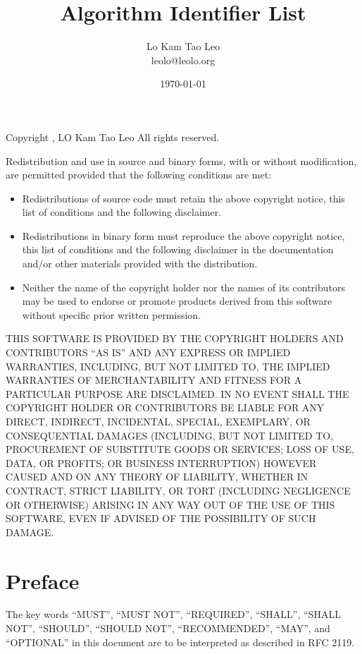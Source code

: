 \documentclass[a4paper,12pt]{article}
\title{Algorithm Identifier List}
\author{Lo Kam Tao Leo\\leolo@leolo.org}
\date{\today}
\begin{document}
	\tableofcontents
	\vspace{25.4mm}
	\noindent
	Copyright , LO Kam Tao Leo
	All rights reserved.
	
	Redistribution and use in source and binary forms, with or without
	modification, are permitted provided that the following conditions are met:
	\begin{itemize}
		\item Redistributions of source code must retain the above copyright notice, this
		list of conditions and the following disclaimer.
		
		\item Redistributions in binary form must reproduce the above copyright notice,
		this list of conditions and the following disclaimer in the documentation
		and/or other materials provided with the distribution.
		
		\item Neither the name of the copyright holder nor the names of its
		contributors may be used to endorse or promote products derived from
		this software without specific prior written permission.
	\end{itemize}

	
	THIS SOFTWARE IS PROVIDED BY THE COPYRIGHT HOLDERS AND CONTRIBUTORS ``AS IS''
	AND ANY EXPRESS OR IMPLIED WARRANTIES, INCLUDING, BUT NOT LIMITED TO, THE
	IMPLIED WARRANTIES OF MERCHANTABILITY AND FITNESS FOR A PARTICULAR PURPOSE ARE
	DISCLAIMED. IN NO EVENT SHALL THE COPYRIGHT HOLDER OR CONTRIBUTORS BE LIABLE
	FOR ANY DIRECT, INDIRECT, INCIDENTAL, SPECIAL, EXEMPLARY, OR CONSEQUENTIAL
	DAMAGES (INCLUDING, BUT NOT LIMITED TO, PROCUREMENT OF SUBSTITUTE GOODS OR
	SERVICES; LOSS OF USE, DATA, OR PROFITS; OR BUSINESS INTERRUPTION) HOWEVER
	CAUSED AND ON ANY THEORY OF LIABILITY, WHETHER IN CONTRACT, STRICT LIABILITY,
	OR TORT (INCLUDING NEGLIGENCE OR OTHERWISE) ARISING IN ANY WAY OUT OF THE USE
	OF THIS SOFTWARE, EVEN IF ADVISED OF THE POSSIBILITY OF SUCH DAMAGE.
	\section{Preface}
	The key words ``MUST'', ``MUST NOT'', ``REQUIRED'', ``SHALL'', ``SHALL
	NOT'', ``SHOULD'', ``SHOULD NOT'', ``RECOMMENDED'',  ``MAY'', and
	``OPTIONAL'' in this document are to be interpreted as described in
	RFC 2119.
\end{document}
